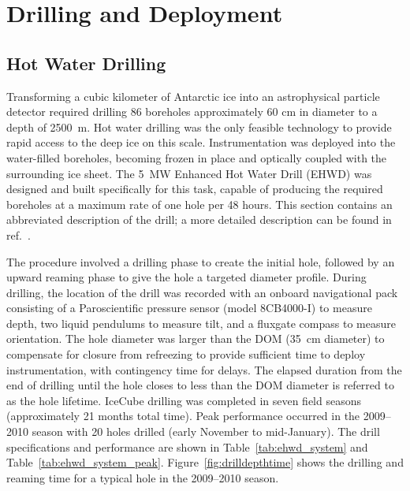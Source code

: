 \section{\label{sec:drill-deploy}Drilling and Deployment}

\subsection{\label{sec:hot_water_drilling}Hot Water Drilling}

Transforming a cubic kilometer of Antarctic ice into an astrophysical
particle detector required drilling 86 boreholes
approximately 60 cm in diameter to a depth of 2500~m. Hot water drilling
was the only
feasible technology to provide rapid access to the deep ice on this scale.
Instrumentation was deployed into the water-filled boreholes, becoming
frozen in place and optically
coupled with the surrounding ice sheet. The 5~MW Enhanced Hot Water Drill
(EHWD) was designed and built specifically for this task,
capable of producing the required boreholes at a maximum rate of one hole per 48
hours. This section contains an abbreviated description of the drill; a more detailed description
can be found in ref.~\cite{ehwd}.

The procedure involved a drilling phase to create the initial hole,
followed by an upward reaming phase to give the 
hole a targeted diameter profile.  During drilling, the location of
the drill was recorded with an onboard navigational pack consisting of
a Paroscientific pressure sensor
(model 8CB4000-I) to measure depth, two
liquid pendulums to measure tilt, and a fluxgate compass to measure
orientation. The hole diameter was larger than
the DOM (35~cm diameter) to compensate for closure from refreezing to provide sufficient
time to deploy instrumentation, with contingency time for delays.  The
elapsed duration from the end of drilling until the hole closes to
less than the DOM diameter is referred to as the hole lifetime. IceCube drilling was
completed in seven field seasons (approximately 21 months total time).
Peak performance occurred in the 2009--2010 season with 20 holes drilled
(early November to mid-January).  The drill specifications and performance
are shown in Table~\ref{tab:ehwd_system} and
Table~\ref{tab:ehwd_system_peak}. Figure~\ref{fig:drilldepthtime} shows the
drilling and reaming time for a typical hole in the 2009--2010 season.

\vspace{\baselineskip}

